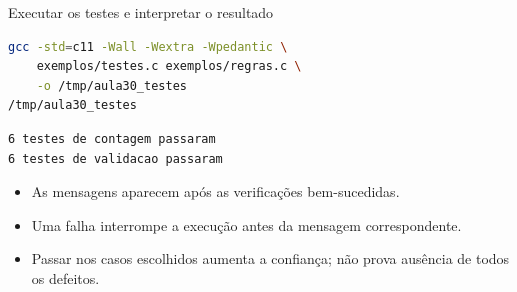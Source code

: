 \begin{frame}[fragile]{Executar os testes e interpretar o resultado}
\begin{lstlisting}[language=bash]
gcc -std=c11 -Wall -Wextra -Wpedantic \
    exemplos/testes.c exemplos/regras.c \
    -o /tmp/aula30_testes
/tmp/aula30_testes
\end{lstlisting}
\begin{lstlisting}[language={}]
6 testes de contagem passaram
6 testes de validacao passaram
\end{lstlisting}
\begin{itemize}
\item As mensagens aparecem após as verificações bem-sucedidas.
\item Uma falha interrompe a execução antes da mensagem correspondente.
\item Passar nos casos escolhidos aumenta a confiança; não prova ausência de todos os defeitos.
\end{itemize}
\end{frame}
